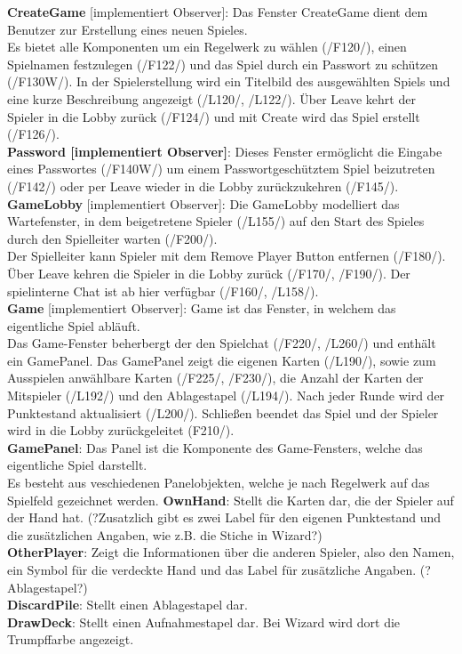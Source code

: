 \documentclass{article}
\begin{document}
\textbf{CreateGame} [implementiert Observer]: Das Fenster CreateGame dient dem Benutzer zur Erstellung eines neuen Spieles.\\
Es bietet alle Komponenten um ein Regelwerk zu wählen (/F120/), einen Spielnamen festzulegen (/F122/) und das Spiel durch ein Passwort zu schützen (/F130W/). In der Spielerstellung wird ein Titelbild des ausgewählten Spiels und eine kurze Beschreibung angezeigt (/L120/, /L122/). Über Leave kehrt der Spieler in die Lobby zurück (/F124/) und mit Create wird das Spiel erstellt (/F126/).\\

\textbf{Password [implementiert Observer]}: Dieses Fenster ermöglicht die Eingabe eines Passwortes (/F140W/) um einem Passwortgeschütztem Spiel beizutreten (/F142/) oder per Leave wieder in die Lobby zurückzukehren (/F145/). \\

\textbf{GameLobby} [implementiert Observer]: Die GameLobby modelliert das Wartefenster, in dem beigetretene Spieler (/L155/) auf den Start des Spieles durch den Spielleiter warten (/F200/).\\
 Der Spielleiter kann Spieler mit dem Remove Player Button entfernen (/F180/). Über Leave kehren die Spieler in die Lobby zurück (/F170/, /F190/). Der spielinterne Chat ist ab hier verfügbar (/F160/, /L158/). \\

\textbf{Game} [implementiert Observer]: Game ist das Fenster, in welchem das eigentliche Spiel abläuft.\\
Das Game-Fenster beherbergt  der den Spielchat (/F220/, /L260/) und enthält ein GamePanel. Das GamePanel zeigt die eigenen Karten (/L190/), sowie zum Ausspielen anwählbare Karten (/F225/, /F230/), die Anzahl der Karten der Mitspieler (/L192/) und den Ablagestapel (/L194/). Nach jeder Runde wird der Punktestand  aktualisiert (/L200/). Schließen beendet das Spiel und der Spieler wird in die Lobby zurückgeleitet (F210/).\\

\textbf{GamePanel}: Das Panel ist die Komponente des Game-Fensters, welche das eigentliche Spiel darstellt.\\
Es besteht aus veschiedenen Panelobjekten, welche je nach Regelwerk auf das Spielfeld gezeichnet werden.
\textbf{OwnHand}: Stellt die Karten dar, die der Spieler auf der Hand hat. (?Zusatzlich gibt es zwei Label für den eigenen Punktestand und die zusätzlichen Angaben, wie z.B. die Stiche in Wizard?)\\
\textbf{OtherPlayer}: Zeigt die Informationen über die anderen Spieler, also den Namen, ein Symbol für die verdeckte Hand und das Label für zusätzliche Angaben. (?Ablagestapel?)\\
\textbf{DiscardPile}: Stellt einen Ablagestapel dar.\\
\textbf{DrawDeck}: Stellt einen Aufnahmestapel dar. Bei Wizard wird dort die Trumpffarbe angezeigt.\\
\end{document}
